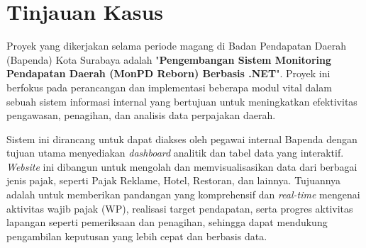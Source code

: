 \section{Tinjauan Kasus}
\label{sec:tinjauankasus}

Proyek yang dikerjakan selama periode magang di Badan Pendapatan Daerah (Bapenda) Kota Surabaya adalah "\textbf{Pengembangan Sistem Monitoring Pendapatan Daerah (MonPD Reborn) Berbasis .NET}". Proyek ini berfokus pada perancangan dan implementasi beberapa modul vital dalam sebuah sistem informasi internal yang bertujuan untuk meningkatkan efektivitas pengawasan, penagihan, dan analisis data perpajakan daerah.

Sistem ini dirancang untuk dapat diakses oleh pegawai internal Bapenda dengan tujuan utama menyediakan \emph{dashboard} analitik dan tabel data yang interaktif. \emph{Website} ini dibangun untuk mengolah dan memvisualisasikan data dari berbagai jenis pajak, seperti Pajak Reklame, Hotel, Restoran, dan lainnya. Tujuannya adalah untuk memberikan pandangan yang komprehensif dan \emph{real-time} mengenai aktivitas wajib pajak (WP), realisasi target pendapatan, serta progres aktivitas lapangan seperti pemeriksaan dan penagihan, sehingga dapat mendukung pengambilan keputusan yang lebih cepat dan berbasis data.

